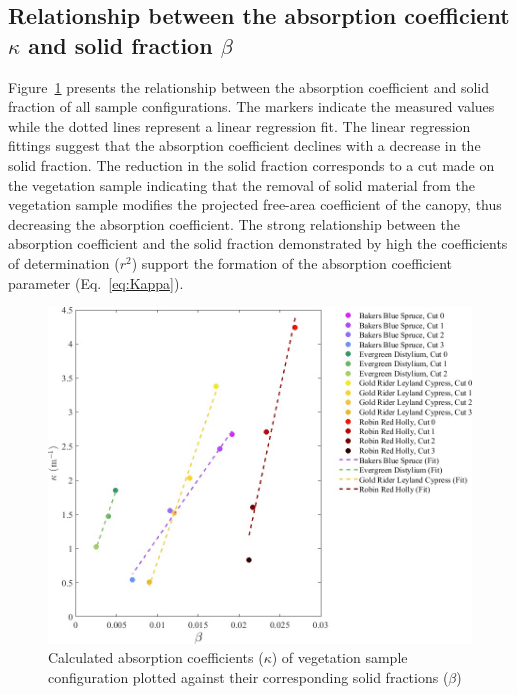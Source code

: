 \documentclass[12pt]{article}
\begin{document}
\subsection{Relationship between the absorption coefficient $\kappa$ and solid fraction $\beta$ }

Figure~\ref{fig:betavkappa} presents the relationship between the absorption coefficient and solid fraction of all sample configurations. The markers indicate the measured values while the dotted lines represent a linear regression fit. The linear regression fittings suggest that the absorption coefficient declines with a decrease in the solid fraction. The reduction in the solid fraction corresponds to a cut made on the vegetation sample indicating that the removal of solid material from the vegetation sample modifies the projected free-area coefficient of the canopy, thus decreasing the absorption coefficient. The strong relationship between the absorption coefficient and the solid fraction demonstrated by high the coefficients of determination ($r^2$) support the formation of the absorption coefficient parameter (Eq.~\ref{eq:Kappa}). 

\begin{figure}[!]
	\centering 	
    \includegraphics[width=1\linewidth]{Picture12.jpg}
	\caption[Comparison of absorption coefficient, $\kappa$, and volume ratio, $\beta$]{Calculated absorption coefficients ($\kappa$) of vegetation sample configuration plotted against their corresponding solid fractions ($\beta$)}
	\label{fig:betavkappa}
\end{figure}
\end{document}
